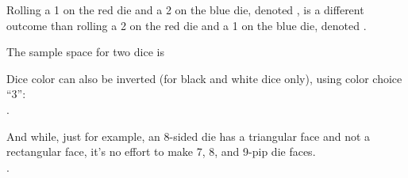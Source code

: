 \documentclass[12pt]{article}
\begin{document}
Rolling a 1 on the red die and a 2 on the blue die, denoted , is a different outcome than rolling a 2 on the red die and a 1 on the blue die, denoted . \\\bigskip

\noindent The sample space for two dice is \\\smallskip


\bigskip

\noindent Dice color can also be inverted (for black and white dice only), using color choice ``3'':\\

.

\bigskip

And while, just for example, an 8-sided die has a triangular face and not a rectangular face, it's no effort to make 7, 8, and 9-pip die faces.\\

.
\end{document}
